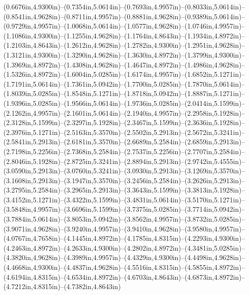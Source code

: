 (0.6676in,4.9300in)--(0.7354in,5.0614in)--(0.7693in,4.9957in)--(0.8033in,5.0614in)--(0.8541in,4.9628in)--(0.8711in,4.9957in)--(0.8881in,4.9628in)--(0.9389in,5.0614in)--(0.9729in,4.9957in)--(1.0068in,5.0614in)--(1.0577in,4.9628in)--(1.0746in,4.9957in)--(1.1086in,4.9300in)--(1.1255in,4.9628in)--(1.1764in,4.8643in)--(1.1934in,4.8972in)--(1.2103in,4.8643in)--(1.2612in,4.9628in)--(1.2782in,4.9300in)--(1.2951in,4.9628in)--(1.3121in,4.9300in)--(1.3290in,4.9628in)--(1.3630in,4.8972in)--(1.3799in,4.9300in)--(1.3969in,4.8972in)--(1.4308in,4.9628in)--(1.4647in,4.8972in)--(1.4986in,4.9628in)--(1.5326in,4.8972in)--(1.6004in,5.0285in)--(1.6174in,4.9957in)--(1.6852in,5.1271in)--(1.7191in,5.0614in)--(1.7361in,5.0942in)--(1.7700in,5.0285in)--(1.7870in,5.0614in)--(1.8039in,5.0285in)--(1.8548in,5.1271in)--(1.8718in,5.0942in)--(1.8887in,5.1271in)--(1.9396in,5.0285in)--(1.9566in,5.0614in)--(1.9736in,5.0285in)--(2.0414in,5.1599in)--(2.1262in,4.9957in)--(2.1601in,5.0614in)--(2.1940in,4.9957in)--(2.2958in,5.1928in)--(2.3128in,5.1599in)--(2.3297in,5.1928in)--(2.3467in,5.1599in)--(2.3636in,5.1928in)--(2.3976in,5.1271in)--(2.5163in,5.3570in)--(2.5502in,5.2913in)--(2.5672in,5.3241in)--(2.5841in,5.2913in)--(2.6181in,5.3570in)--(2.6689in,5.2584in)--(2.6859in,5.2913in)--(2.7198in,5.2256in)--(2.7368in,5.2584in)--(2.7537in,5.2256in)--(2.7707in,5.2584in)--(2.8046in,5.1928in)--(2.8725in,5.3241in)--(2.8894in,5.2913in)--(2.9742in,5.4555in)--(3.0590in,5.2913in)--(3.0760in,5.3241in)--(3.0930in,5.2913in)--(3.1269in,5.3570in)--(3.1608in,5.2913in)--(3.1947in,5.3570in)--(3.2456in,5.2584in)--(3.2626in,5.2913in)--(3.2795in,5.2584in)--(3.2965in,5.2913in)--(3.3643in,5.1599in)--(3.3813in,5.1928in)--(3.4152in,5.1271in)--(3.4322in,5.1599in)--(3.4831in,5.0614in)--(3.5170in,5.1271in)--(3.5848in,4.9957in)--(3.6696in,5.1599in)--(3.7375in,5.0285in)--(3.7714in,5.0942in)--(3.7884in,5.0614in)--(3.8053in,5.0942in)--(3.8562in,4.9957in)--(3.8732in,5.0285in)--(3.9071in,4.9628in)--(3.9240in,4.9957in)--(3.9410in,4.9628in)--(3.9580in,4.9957in)--(4.0767in,4.7658in)--(4.1445in,4.8972in)--(4.1785in,4.8315in)--(4.2293in,4.9300in)--(4.2463in,4.8972in)--(4.2633in,4.9300in)--(4.2802in,4.8972in)--(4.3481in,5.0285in)--(4.3820in,4.9628in)--(4.3989in,4.9957in)--(4.4329in,4.9300in)--(4.4498in,4.9628in)--(4.4668in,4.9300in)--(4.4837in,4.9628in)--(4.5516in,4.8315in)--(4.5855in,4.8972in)--(4.6194in,4.8315in)--(4.6534in,4.8972in)--(4.6703in,4.8643in)--(4.6873in,4.8972in)--(4.7212in,4.8315in)--(4.7382in,4.8643in)
